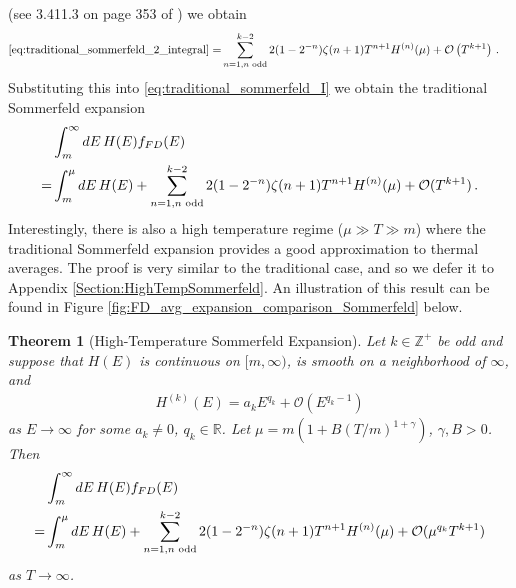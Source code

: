 \documentclass[sn-mathphys,Numbered]{sn-jnl}
\newtheorem{theorem}{Theorem}
\begin{document}
(see 3.411.3 on page 353 of  \cite{Gradshteyn:1943cpj}) we obtain 
\begin{align}
   \eqref{eq:traditional_sommerfeld_2_integral}     
   =&\sum_{n=1,n\text{ odd}}^{k-2} 2(1-2^{-n})\zeta(n+1)T^{n+1} H^{(n)}(\mu) +\mathcal{O}\left(T^{k+1}\right)\,.
\end{align}
Substituting this into \eqref{eq:traditional_sommerfeld_I} we obtain the traditional Sommerfeld expansion
\begin{align}
 &\int_m^\infty dE\, H(E) f_{FD}(E)\notag\\
  = &\int_m^\mu dE\, H(E)+\sum_{n=1,n\text{ odd}}^{k-2} 2(1-2^{-n})\zeta(n+1)T^{n+1} H^{(n)}(\mu) +\mathcal{O}(T^{k+1})\,.\label{eq:traditional_Sommerfeld_final}
   \end{align}
Interestingly, there is also a high temperature regime ($\mu\gg T\gg m$) where the traditional Sommerfeld expansion provides a good approximation to thermal averages.  The proof is very similar to the traditional case, and so we defer it to Appendix  \ref{Section:HighTempSommerfeld}. An illustration of this result can be found in Figure \ref{fig:FD_avg_expansion_comparison_Sommerfeld} below.
\begin{theorem}[High-Temperature Sommerfeld Expansion]\label{thm:high_T_Sommerfeld_main}
Let $k\in\mathbb{Z}^+$ be odd and suppose that $H(E)$ is continuous on $[m,\infty)$, is smooth on a neighborhood of $\infty$, and
\begin{align}
  H^{(k)}(E)=a_kE^{q_k}+\mathcal{O}(E^{q_k-1})  
\end{align}
as $E\to \infty$ for some $a_k\neq 0$, $q_k\in\mathbb{R}$.  Let $\mu=m(1+B(T/m)^{1+\gamma})$, $\gamma,B>0$. Then
\begin{align}
    &\int_m^\infty dE\, H(E)f_{FD}(E)\notag\\
=&\int_m^\mu dE\, H(E)+\sum_{n=1,n\text{ odd}}^{k-2} 2(1-2^{-n})\zeta(n+1)T^{n+1}H^{(n)}(\mu)+\mathcal{O}(\mu^{q_k}T^{k+1})\label{eq:Sommerfeld_high_temp_final_main}
\end{align}
as $T\to\infty$.
\end{theorem}
\end{document}
